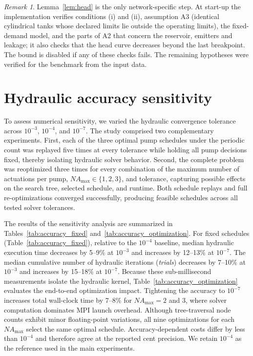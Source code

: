 \documentclass[11pt]{article}
\theoremstyle{remark}
\newtheorem{remark}{Remark}
\begin{document}
\begin{remark}\label{rem:generality}
Lemma~\ref{lem:head} is the only network-specific step.  At start-up the implementation
verifies conditions (i) and (ii), assumption A3 (identical cylindrical tanks whose declared
limits lie outside the operating limits), the fixed-demand model, and the parts of A2 that
concern the reservoir, emitters and leakage; it also checks that the head curve decreases
beyond the last breakpoint. The bound is disabled if any of these checks fails. The
remaining hypotheses were verified for the benchmark from the input data.
\end{remark}


\section{Hydraulic accuracy sensitivity}\label{sec:accuracy}

To assess numerical sensitivity, we varied the hydraulic convergence tolerance across $10^{-3}$, $10^{-4}$, and $10^{-7}$. The study comprised two complementary experiments. First, each of the three optimal pump schedules under the periodic count was replayed five times at every tolerance while holding all pump decisions fixed, thereby isolating hydraulic solver behavior. Second, the complete problem was reoptimized three times for every combination of the maximum number of actuations per pump, $NA_{\max}\in\{1,2,3\}$, and tolerance, capturing possible effects on the search tree, selected schedule, and runtime. Both schedule replays and full re-optimizations converged successfully, producing feasible schedules across all tested solver tolerances.

The results of the sensitivity analysis are summarized in Tables~\ref{tab:accuracy_fixed} and~\ref{tab:accuracy_optimization}. For fixed schedules (Table~\ref{tab:accuracy_fixed}), relative to the $10^{-4}$ baseline, median hydraulic execution time decreases by 5--9\% at $10^{-3}$ and increases by 12--13\% at $10^{-7}$. The median cumulative number of hydraulic iterations (\emph{trials}) decreases by 7--10\% at $10^{-3}$ and increases by 15--18\% at $10^{-7}$. Because these sub-millisecond measurements isolate the hydraulic kernel, Table~\ref{tab:accuracy_optimization} evaluates the end-to-end optimization impact. Tightening the accuracy to $10^{-7}$ increases total wall-clock time by 7--8\% for $NA_{\max}=2$ and $3$, where solver computation dominates MPI launch overhead. Although tree-traversal node counts exhibit minor floating-point variations, all nine optimizations for each $NA_{\max}$ select the same optimal schedule. Accuracy-dependent costs differ by less than $10^{-4}$ and therefore agree at the reported cent precision. We retain $10^{-4}$ as the reference used in the main experiments.
\end{document}
